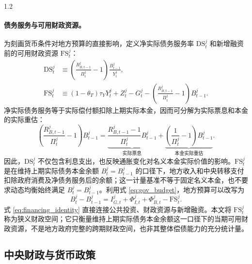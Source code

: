 \documentclass[12pt,UTF8]{ctexart}
\newcommand{\DS}{\mathrm{DS}}
\newcommand{\FS}{\mathrm{FS}}
\begin{document}
\begin{spacing}{1.2}
		\paragraph{债务服务与可用财政资源。}
		
		为刻画货币条件对地方预算的直接影响，定义净实际债务服务率 $\DS_t^j$ 和新增融资前的可用财政资源 $\FS_t^j$：
		\begin{align}
			\DS_t^j&\equiv\left(\frac{R_{B,t-1}^j}{\Pi_t^j}-1\right)\frac{B_{t-1}^j}{Y_t^j},
			\label{eq:DS}\\
			\FS_t^j&\equiv(1-\theta_T)\tau_Y Y_t^j+Z_t^j-G_t^j
			-\left(\frac{R_{B,t-1}^j}{\Pi_t^j}-1\right)B_{t-1}^j.
			\label{eq:FS}
		\end{align}
		净实际债务服务等于实际偿付额扣除上期实际本金，因而可分解为实际票息和本金的实际重估：
		\begin{equation}
			\left(\frac{R_{B,t-1}^j}{\Pi_t^j}-1\right)B_{t-1}^j
			=\underbrace{\frac{R_{B,t-1}^j-1}{\Pi_t^j}B_{t-1}^j}_{\text{实际票息}}
			+\underbrace{\left(\frac{1}{\Pi_t^j}-1\right)B_{t-1}^j}_{\text{本金实际重估}}.
			\label{eq:debt_service_decomposition}
		\end{equation}
		因此，$\DS_t^j$ 不仅包含利息支出，也反映通胀变化对名义本金实际价值的影响。$\FS_t^j$ 是在维持上期实际债务本金余额 $B_t^j=B_{t-1}^j$ 的口径下，地方收入和中央转移支付扣除政府消费及净债务服务后的余额；这一计量基准不等于固定名义本金，也不要求动态均衡始终满足 $B_t^j=B_{t-1}^j$。利用式 \eqref{eq:gov_budget}，地方预算可以改写为
		\begin{equation}
			B_t^j-B_{t-1}^j=I_{G,t}^j+\Phi_{I,t}^j+\Phi_{B,t}^j-\FS_t^j.
			\label{eq:financing_identity}
		\end{equation}
		式 \eqref{eq:financing_identity} 直接连接公共投资、财政资源与新增融资。本文将 $\FS_t^j$ 称为狭义财政空间；它只衡量维持上期实际债务本金余额这一口径下的当期可用财政资源，不是地方政府完整的跨期财政空间，也非其整体偿债能力的充分统计量。
		
		\subsection{中央财政与货币政策}
		

\end{spacing}
\end{document}
